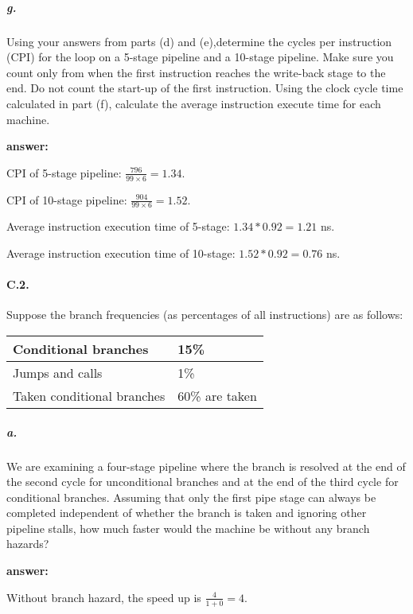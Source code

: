 \documentclass{article}
\begin{document}
\subparagraph{g.} Using your answers from parts (d) and (e),determine the cycles per instruction (CPI) for the loop on a 5-stage pipeline and a 10-stage pipeline. Make sure you count only from when the first instruction reaches the write-back stage to the end. Do not count the start-up of the first instruction. Using the clock cycle time calculated in part (f), calculate the average instruction execute time for each machine.

\noindent \textbf{answer:}

CPI of 5-stage pipeline: $\frac{796}{99\times 6}=1.34$.

CPI of 10-stage pipeline: $\frac{904}{99\times 6}=1.52$.

Average instruction execution time of 5-stage: $1.34*0.92=1.21$ ns.

Average instruction execution time of 10-stage: $1.52*0.92=0.76$ ns.

\paragraph{C.2.} Suppose the branch frequencies (as percentages of all instructions) are as follows:

\begin{table}[ht!]
\begin{center}
\begin{tabular}{l|l} %
    \toprule
    Conditional branches & 15\%\\
    \hline
    Jumps and calls & 1\%\\
    \hline
    Taken conditional branches &60\% are taken\\
    \bottomrule
    \end{tabular}
\end{center}
\end{table}

\subparagraph{a.} We are examining a four-stage pipeline where the branch is resolved at the end of the second cycle for unconditional branches and at the end of the third cycle for conditional branches. Assuming that only the first pipe stage can always be completed independent of whether the branch is taken and ignoring other pipeline stalls, how much faster would the machine be without any branch hazards? 

\noindent \textbf{answer:}

Without branch hazard, the speed up is $\frac{4}{1+0}=4$.
\end{document}
